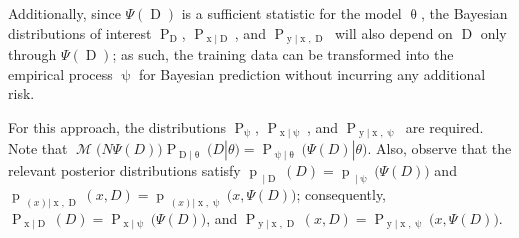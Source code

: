 \documentclass[12pt]{report}
\DeclareMathOperator{\xrm}{\mathrm{x}}
\DeclareMathOperator{\yrm}{\mathrm{y}}
\DeclareMathOperator{\Drm}{\mathrm{D}}
\DeclareMathOperator{\Prm}{\mathrm{P}}
\DeclareMathOperator{\prm}{\mathrm{p}}
\DeclareMathOperator{\Mcal}{\mathcal{M}}
\DeclareMathOperator{\upthetam}{\uptheta_\text{m}}
\DeclareMathOperator{\upthetac}{\uptheta_\text{c}}
\begin{document}
Additionally, since $\Psi(\Drm)$ is a sufficient statistic for the model $\uptheta$, the Bayesian distributions of interest $\Prm_{\Drm}$, $\Prm_{\xrm | \Drm}$, and $\Prm_{\yrm | \xrm,\Drm}$ will also depend on $\Drm$ only through $\Psi(\Drm)$; as such, the training data can be transformed into the empirical process $\uppsi$ for Bayesian prediction without incurring any additional risk. 

For this approach, the distributions $\Prm_{\uppsi}$, $\Prm_{\xrm | \uppsi}$, and $\Prm_{\yrm | \xrm,\uppsi}$ are required. Note that $\Mcal\big( N \Psi(D) \big) \Prm_{\Drm | \uptheta}(D | \theta) = \Prm_{\uppsi | \uptheta}\big( \Psi(D) | \theta \big)$. Also, observe that the relevant posterior distributions satisfy $\prm_{\upthetam | \Drm}(D) = \prm_{\upthetam | \uppsi}\big( \Psi(D) \big)$ and $\prm_{\upthetac(x) | \xrm,\Drm}(x,D) = \prm_{\upthetac(x) | \xrm,\uppsi}\big( x,\Psi(D) \big)$; consequently, $\Prm_{\xrm | \Drm}(D) = \Prm_{\xrm | \uppsi}\big( \Psi(D) \big)$, and $\Prm_{\yrm | \xrm,\Drm}(x,D) = \Prm_{\yrm | \xrm,\uppsi}\big( x,\Psi(D) \big)$.
\end{document}
